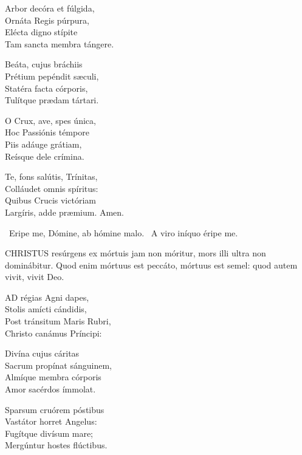 Arbor decóra et fúlgida,\\
Ornáta Regis púrpura,\\
Elécta digno stípite\\
Tam sancta membra tángere.

Beáta, cujus bráchiis\\
Prétium pepéndit sæculi,\\
Statéra facta córporis,\\
Tulítque prædam tártari.


O Crux, ave, spes única,\\
Hoc Passiónis témpore\\
Piis adáuge grátiam,\\
Reísque dele crímina.

Te, fons salútis, Trínitas,\\
Colláudet omnis spíritus:\\
Quibus Crucis victóriam\\
Largíris, adde præmium. Amen.

\V\ Eripe me, Dómine, ab hómine malo. \R\ A viro iníquo éripe me.





\lettrine[lines=2]{C}{HRISTUS} resúrgens ex mórtuis jam non móritur, mors illi ultra non dominábitur. Quod enim mórtuus est peccáto, mórtuus est semel: quod autem vivit, vivit Deo.


\lettrine[lines=2]{A}{D} régias Agni dapes,\\
Stolis amícti cándidis,\\
Post tránsitum Maris Rubri,\\
Christo canámus Príncipi:

Divína cujus cáritas\\
Sacrum propínat sánguinem,\\
Almíque membra córporis\\
Amor sacérdos ímmolat.

Sparsum cruórem póstibus\\
Vastátor horret Angelus:\\
Fugítque divísum mare;\\
Mergúntur hostes flúctibus.

